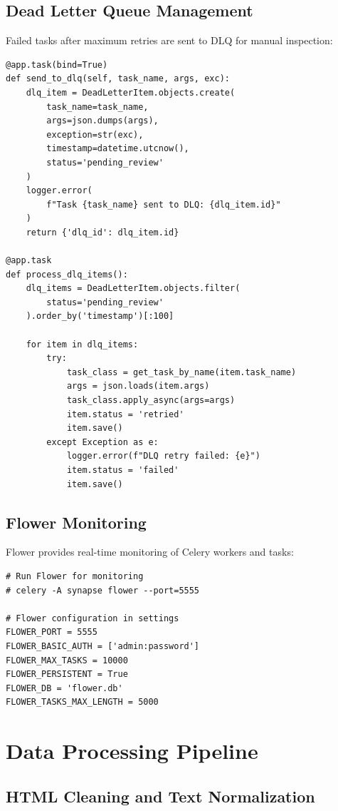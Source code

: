 \documentclass[12pt,a4paper]{report}
\begin{document}
\section{Dead Letter Queue Management}

Failed tasks after maximum retries are sent to DLQ for manual inspection:

\begin{lstlisting}
@app.task(bind=True)
def send_to_dlq(self, task_name, args, exc):
    dlq_item = DeadLetterItem.objects.create(
        task_name=task_name,
        args=json.dumps(args),
        exception=str(exc),
        timestamp=datetime.utcnow(),
        status='pending_review'
    )
    logger.error(
        f"Task {task_name} sent to DLQ: {dlq_item.id}"
    )
    return {'dlq_id': dlq_item.id}

@app.task
def process_dlq_items():
    dlq_items = DeadLetterItem.objects.filter(
        status='pending_review'
    ).order_by('timestamp')[:100]
    
    for item in dlq_items:
        try:
            task_class = get_task_by_name(item.task_name)
            args = json.loads(item.args)
            task_class.apply_async(args=args)
            item.status = 'retried'
            item.save()
        except Exception as e:
            logger.error(f"DLQ retry failed: {e}")
            item.status = 'failed'
            item.save()
\end{lstlisting}

\section{Flower Monitoring}

Flower provides real-time monitoring of Celery workers and tasks:

\begin{lstlisting}
# Run Flower for monitoring
# celery -A synapse flower --port=5555

# Flower configuration in settings
FLOWER_PORT = 5555
FLOWER_BASIC_AUTH = ['admin:password']
FLOWER_MAX_TASKS = 10000
FLOWER_PERSISTENT = True
FLOWER_DB = 'flower.db'
FLOWER_TASKS_MAX_LENGTH = 5000
\end{lstlisting}

\chapter{Data Processing Pipeline}

\section{HTML Cleaning and Text Normalization}
\end{document}
